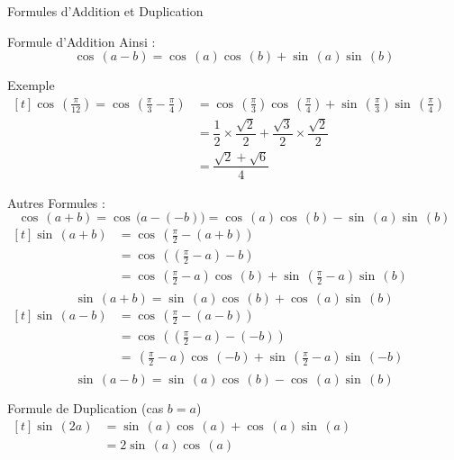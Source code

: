 \documentclass{cours}
\let\frac\tfrac %
\begin{document}
\begin{Gpartie}{Formules d'Addition et Duplication}
\begin{Spartie}{Formule d'Addition}
            Ainsi : \[\cos\,(a-b)=\cos\,(a)\cos\,(b)+\sin\,(a)\sin\,(b)\]
            \begin{SSpartie}{Exemple} 
                $\begin{aligned}[t]
                    \cos\,\left(\frac{\pi}{12}\right)=\cos\,\left(\frac{\pi}{3}-\frac{\pi}{4}\right) &= \cos\,\left(\frac{\pi}{3}\right)\cos\,\left(\frac{\pi}{4}\right)+\sin\,\left(\frac{\pi}{3}\right)\sin\,\left(\frac{\pi}{4}\right) \\
                    &= \dfrac{1}{2}\times\dfrac{\sqrt{2}}{2}+\dfrac{\sqrt{3}}{2}\times\dfrac{\sqrt{2}}{2} \\
                    &= \dfrac{\sqrt{2}+\sqrt{6}}{4}
                \end{aligned}$
            \end{SSpartie}
            Autres Formules :
            \[\cos\,(a+b)=\cos\,\big(a-(-b)\big)=\cos\,(a)\cos\,(b)-\sin\,(a)\sin\,(b)\]
            $\begin{aligned}[t]
                \sin\,(a+b) &= \cos\,\left(\frac{\pi}{2}-(a+b)\right) \\
                &= \cos\,\left(\left(\frac{\pi}{2}-a\right)-b\right) \\
                &= \cos\,\left(\frac{\pi}{2}-a\right)\cos\,(b)+\sin\,\left(\frac{\pi}{2}-a\right)\sin\,(b) \\
            \end{aligned}$
            \[\sin\,(a+b)=\sin\,(a)\cos\,(b)+\cos\,(a)\sin\,(b)\]
            $\begin{aligned}[t]
                \sin\,(a-b) &= \cos\,\left(\frac{\pi}{2}-(a-b)\right) \\
                &= \cos\,\left(\left(\frac{\pi}{2}-a\right)-(-b)\right) \\
                &= \,\left(\frac{\pi}{2}-a\right)\cos\,(-b)+\sin\,\left(\frac{\pi}{2}-a\right)\sin\,(-b) \\
            \end{aligned}$
            \[\sin\,(a-b)=\sin\,(a)\cos\,(b)-\cos\,(a)\sin\,(b)\]
        \end{Spartie}
        \begin{Spartie}{Formule de Duplication (cas $b=a$)} 
            $\begin{aligned}[t]
                \sin\,(2a) &= \sin\,(a)\cos\,(a)+\cos\,(a)\sin\,(a) \\
                &=2\sin\,(a)\cos\,(a)
            \end{aligned}$


\end{Spartie}
\end{Gpartie}
\end{document}
